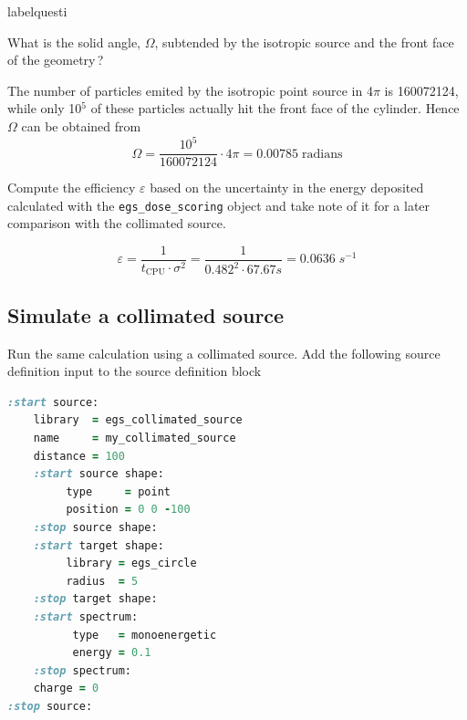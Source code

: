 \documentclass[12pt,twoside]{article}
\makeatletter
\renewcommand\thequesti         {\@arabic\c@questi}
\newenvironment{question}{
    \bfseries
    \edef\@questictr{questi}
    \expandafter
    \list \csname label\@questictr\endcsname {
        \usecounter\@questictr\def\makelabel##1{\hss\llap{##1}}
        \savebox{\questbox}             {\thequesti}
        \setlength\labelsep             {0.6em}
        \setlength\labelwidth           {\wd\questbox}
        \setlength\leftmargini          {\labelwidth}
        \addtolength{\leftmargini}      {\labelsep}
        \addtolength{\leftmargini}      {0.2em}
        \leftmargin\leftmargini
        \setlength\topsep               {1em}
        \setlength\itemsep              {1.2em}
        \setlength\parsep               {0.5em}
    }
}{\normalfont\endlist}
\newenvironment{answer}{\normalfont}{\relax}
\makeatother
\begin{document}
\begin{question}
\begin{answer}
\end{answer}

\item What is the solid angle, $\Omega$, subtended by the isotropic source and
the front face of the geometry\,?

\begin{answer}
The number of particles emited by the isotropic point source in 4$\pi$ is
160072124, while only 10$^5$ of these particles actually hit the front face of
the cylinder. Hence $\Omega$ can be obtained from
\begin{equation*}
 \Omega = \frac{10^5}{160072124}\cdot 4\pi = 0.00785\; \mathrm{radians}
\end{equation*}

\end{answer}

\item Compute the efficiency $\varepsilon$ based on the uncertainty in the
energy deposited calculated with the \Verb+egs_dose_scoring+ object
and take note of it for a later comparison with the collimated source.

\begin{answer}
\begin{equation*}
\varepsilon = \frac{1}{t_\mathrm{CPU}\cdot \sigma^2} = \frac{1}{0.482^2 \cdot
67.67 s} = 0.0636\; s^{-1}
\end{equation*}
\end{answer}

\end{question}

\subsection{Simulate a collimated source}

Run the same calculation using a collimated source. Add the following source
definition input to the source definition block


{\renewcommand\baselinestretch{1}
\begin{lstlisting}[language=ruby,backgroundcolor=\color{white}]
:start source:
    library  = egs_collimated_source
    name     = my_collimated_source
    distance = 100
    :start source shape:
         type     = point
         position = 0 0 -100
    :stop source shape:
    :start target shape:
         library = egs_circle
         radius  = 5
    :stop target shape:
    :start spectrum:
          type   = monoenergetic
          energy = 0.1
    :stop spectrum:
    charge = 0
:stop source:
\end{lstlisting}
}
\end{document}
